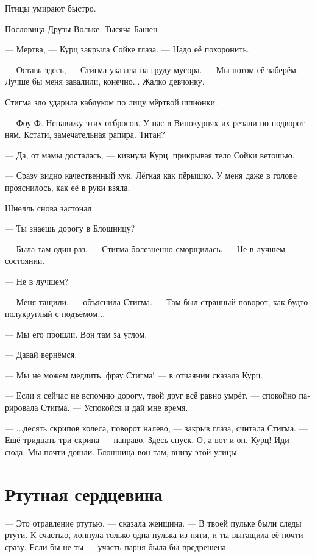 \documentclass[a4paper,12pt,fleqn]{book}\usepackage{polyglossia}\setdefaultlanguage[babelshorthands=true]{russian}\setotherlanguage{english}\defaultfontfeatures{Ligatures=TeX,Mapping=tex-text}\usepackage{xcolor}\newcommand{\ml}[3]{#2}
\newcommand{\textspace}{\vspace{1em}{\centering\Large\bfseries<...>\par}\vspace{1em}}
\begin{document}
\textspace

\epigraph
{\ml{$0$}
{Птицы умирают быстро.}
{Birds die fast.}}
{Пословица Друзы Вольке, Тысяча Башен}

--- Мертва, --- Курц закрыла Сойке глаза.
--- Надо её похоронить.

--- Оставь здесь, --- Стигма указала на груду мусора.
--- Мы потом её заберём.
\ml{$0$}
{Лучше бы меня завалили, конечно...}
{It'd better be me than her, of course ...}
\ml{$0$}
{Жалко девчонку.}
{Poor child.''}

Стигма зло ударила каблуком по лицу мёртвой шпионки.

\ml{$0$}
{--- Фоу-Ф.}
{``Foe-F.}
\ml{$0$}
{Ненавижу этих отбросов.}
{I hate that scum.}
У нас в Винокурнях их резали по подворотням.
Кстати, замечательная рапира.
Титан?

--- Да, от мамы досталась, --- кивнула Курц, прикрывая тело Сойки ветошью.

--- Сразу видно качественный хук.
Лёгкая как пёрышко.
У меня даже в голове прояснилось, как её в руки взяла.

Шнелль снова застонал.

--- Ты знаешь дорогу в Блошницу?

--- Была там один раз, --- Стигма болезненно сморщилась.
--- Не в лучшем состоянии.

--- Не в лучшем?

--- Меня тащили, --- объяснила Стигма.
--- Там был странный поворот, как будто полукруглый с подъёмом...

--- Мы его прошли.
Вон там за углом.

--- Давай вернёмся.

--- Мы не можем медлить, фрау Стигма! --- в отчаянии сказала Курц.

--- Если я сейчас не вспомню дорогу, твой друг всё равно умрёт, --- спокойно парировала Стигма.
--- Успокойся и дай мне время.

--- ...десять скрипов колеса, поворот налево, --- закрыв глаза, считала Стигма.
--- Ещё тридцать три скрипа --- направо.
Здесь спуск.
О, а вот и он.
Курц!
Иди сюда.
Мы почти дошли.
\ml{$0$}
{Блошница вон там, внизу этой улицы.}
{Fleafur is right there, at the end of this alley.''} %

\section{Ртутная сердцевина}

--- Это отравление ртутью, --- сказала женщина.
--- В твоей пульке были следы ртути.
К счастью, лопнула только одна пулька из пяти, и ты вытащила её почти сразу.
Если бы не ты --- участь парня была бы предрешена.
\end{document}
